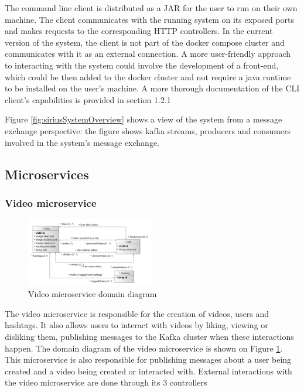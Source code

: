 \documentclass[parskip=full]{article}
\begin{document}
    The command line client is distributed as a JAR for the user to run on their own machine.
    The client communicates with the running system on its exposed ports and makes requests to the corresponding HTTP controllers.
    In the current version of the system, the client is not part of the docker compose cluster and communicates with it as an external connection.
    A more user-friendly approach to interacting with the system could involve the development of a front-end, which could be then added to the docker cluster and not require a java runtime to be installed on the user's machine.
    A more thorough documentation of the CLI client's capabilities is provided in section 1.2.1

    Figure \ref{fig:siriusSystemOverview} shows a view of the system from a message exchange perspective: the figure shows kafka streams, producers and consumers involved in the system's message exchange.

    \pagebreak
    \subsection{Microservices}
    \subsubsection{Video microservice}

    \begin{figure}
        \includegraphics[width=0.5\textwidth]{vm-domain-diagram}
        \caption{Video microservice domain diagram}
        \label{fig:vmDomain}
    \end{figure}
    The video microservice is responsible for the creation of videos, users and hashtags.
    It also allows users to interact with videos by liking, viewing or disliking them, publishing messages to the Kafka cluster when these interactions happen.
    The domain diagram of the video microservice is shown on Figure \ref{fig:vmDomain}.
    This microservice is also responsible for publishing messages about a user being created and a video being created or interacted with.
    External interactions with the video microservice are done through its 3 controllers
\end{document}

